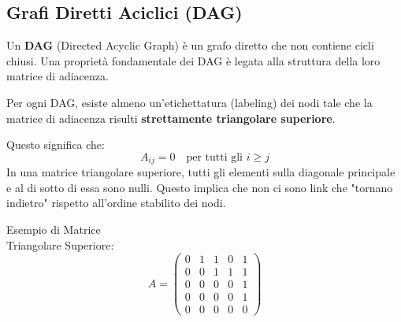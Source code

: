 \subsection{Grafi Diretti Aciclici (DAG)}
Un \textbf{DAG} (Directed Acyclic Graph) è un grafo diretto che non contiene cicli chiusi.
Una proprietà fondamentale dei DAG è legata alla struttura della loro matrice di adiacenza.
\begin{tcolorbox}[colback=colorC!15, colframe=colorC!70!colorB,  title=\textbf{Teorema:}]
Per ogni DAG, esiste almeno un'etichettatura (labeling) dei nodi tale che la matrice di adiacenza risulti \textbf{strettamente triangolare superiore}.
\end{tcolorbox}

Questo significa che:
\begin{equation}
A_{ij} = 0 \quad \text{per tutti gli } i \ge j
\end{equation}
In una matrice triangolare superiore, tutti gli elementi sulla diagonale principale e al di sotto di essa sono nulli. Questo implica che non ci sono link che "tornano indietro" rispetto all'ordine stabilito dei nodi.


\noindent
\begin{minipage}{0.35\textwidth}
{Esempio di Matrice \\ Triangolare Superiore:}
\begin{equation*}
A = 
\begin{pmatrix} 
0 & 1 & 1 & 0 & 1 \\ 
0 & 0 & 1 & 1 & 1 \\ 
0 & 0 & 0 & 0 & 1 \\ 
0 & 0 & 0 & 0 & 1 \\ 
0 & 0 & 0 & 0 & 0 
\end{pmatrix}
\end{equation*}
\end{minipage}
\hfill
\begin{minipage}{0.55\textwidth}
\centering
{}
\end{minipage}



